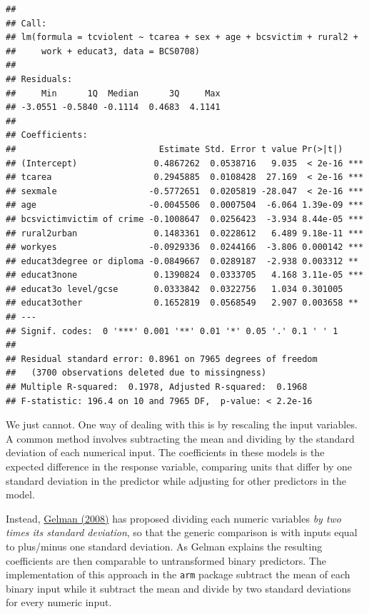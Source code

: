 \documentclass[]{book}
\theoremstyle{definition}
\theoremstyle{definition}
\theoremstyle{definition}
\theoremstyle{remark}
\begin{document}
\begin{verbatim}
## 
## Call:
## lm(formula = tcviolent ~ tcarea + sex + age + bcsvictim + rural2 + 
##     work + educat3, data = BCS0708)
## 
## Residuals:
##     Min      1Q  Median      3Q     Max 
## -3.0551 -0.5840 -0.1114  0.4683  4.1141 
## 
## Coefficients:
##                            Estimate Std. Error t value Pr(>|t|)    
## (Intercept)               0.4867262  0.0538716   9.035  < 2e-16 ***
## tcarea                    0.2945885  0.0108428  27.169  < 2e-16 ***
## sexmale                  -0.5772651  0.0205819 -28.047  < 2e-16 ***
## age                      -0.0045506  0.0007504  -6.064 1.39e-09 ***
## bcsvictimvictim of crime -0.1008647  0.0256423  -3.934 8.44e-05 ***
## rural2urban               0.1483361  0.0228612   6.489 9.18e-11 ***
## workyes                  -0.0929336  0.0244166  -3.806 0.000142 ***
## educat3degree or diploma -0.0849667  0.0289187  -2.938 0.003312 ** 
## educat3none               0.1390824  0.0333705   4.168 3.11e-05 ***
## educat3o level/gcse       0.0333842  0.0322756   1.034 0.301005    
## educat3other              0.1652819  0.0568549   2.907 0.003658 ** 
## ---
## Signif. codes:  0 '***' 0.001 '**' 0.01 '*' 0.05 '.' 0.1 ' ' 1
## 
## Residual standard error: 0.8961 on 7965 degrees of freedom
##   (3700 observations deleted due to missingness)
## Multiple R-squared:  0.1978, Adjusted R-squared:  0.1968 
## F-statistic: 196.4 on 10 and 7965 DF,  p-value: < 2.2e-16
\end{verbatim}

We just cannot. One way of dealing with this is by rescaling the input
variables. A common method involves subtracting the mean and dividing by
the standard deviation of each numerical input. The coefficients in
these models is the expected difference in the response variable,
comparing units that differ by one standard deviation in the predictor
while adjusting for other predictors in the model.

Instead,
\href{http://www.stat.columbia.edu/~gelman/research/published/standardizing7.pdf}{Gelman
(2008)} has proposed dividing each numeric variables \emph{by two times
its standard deviation}, so that the generic comparison is with inputs
equal to plus/minus one standard deviation. As Gelman explains the
resulting coefficients are then comparable to untransformed binary
predictors. The implementation of this approach in the \texttt{arm}
package subtract the mean of each binary input while it subtract the
mean and divide by two standard deviations for every numeric input.
\end{document}
